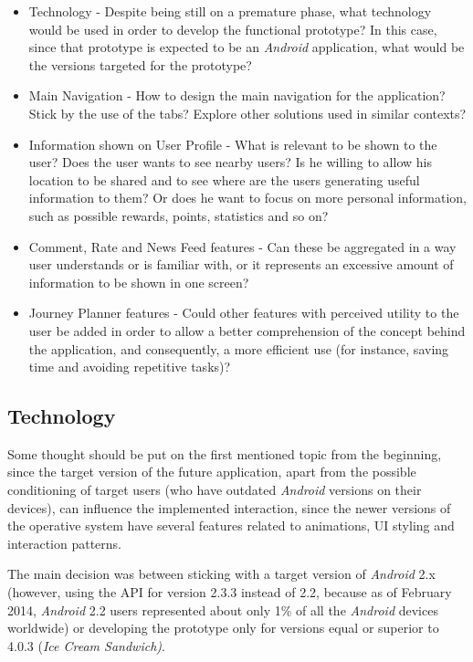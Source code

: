 \begin{itemize}
\item Technology - Despite being still on a premature phase, what technology would be used in order to develop the functional prototype? In this case, since that prototype is expected to be an \emph{Android} application, what would be the versions targeted for the prototype?

\item Main Navigation - How to design the main navigation for the application? Stick by the use of the tabs? Explore other solutions used in similar contexts? 

\item Information shown on User Profile - What is relevant to be shown to the user? Does the user wants to see nearby users? Is he willing to allow his location to be shared and to see where are the users generating useful information to them? Or does he want to focus on more personal information, such as possible rewards, points, statistics and so on?

\item Comment, Rate and News Feed features - Can these be aggregated in a way user understands or is familiar with, or it represents an excessive amount of information to be shown in one screen? 

\item Journey Planner features - Could other features with perceived utility to the user be added in order to allow a better comprehension of the concept behind the application, and consequently, a more efficient use (for instance, saving time and avoiding repetitive tasks)?
\end{itemize}

\subsection{Technology}\label{technology}
Some thought should be put on the first mentioned topic from the beginning, since the target version of the future application, apart from the possible conditioning of target users (who have outdated \emph{Android} versions on their devices), can influence the implemented interaction, since the newer versions of the operative system have several features related to animations, UI styling and interaction patterns.

The main decision was between sticking with a target version of \emph{Android} 2.x (however, using the API for version 2.3.3 instead of 2.2, because as of February 2014, \emph{Android} 2.2 users represented about only 1\% of all the \emph{Android} devices worldwide) or developing the prototype only for versions equal or superior to 4.0.3 (\emph{Ice Cream Sandwich)}. 

